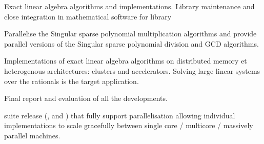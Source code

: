 \begin{workpackage}
\begin{wpdelivs}
  \begin{wpdeliv}[due=36,miles=hpc-prototype,id=LinBox-algo,dissem=PU,nature=DEM, lead=UJF,issue=110]
    {Exact linear algebra algorithms and implementations. Library maintenance and close integration
      in mathematical software for \Linbox library}
  \end{wpdeliv}
  \begin{wpdeliv}[due=48,miles=eval,id=singular-polyarith,dissem=PU,nature=DEM, lead=UK,issue=111]
      {Parallelise the Singular sparse polynomial multiplication algorithms and
        provide parallel versions of the Singular sparse polynomial division and GCD algorithms.}
\end{wpdeliv}
  \begin{wpdeliv}[due=48,miles=eval,id=LinBox-distributed,dissem=PU,nature=DEM, lead=UJF,issue=112]
    {Implementations of exact linear algebra algorithms on distributed memory et heterogenous
      architectures: clusters and accelerators. Solving large linear systems
      over the rationals is the target application.} 
  \end{wpdeliv}
  \begin{wpdeliv}[due=48,miles=eval,id=GAP-HPC-report,dissem=PU,nature=R,lead=SA,issue=113]
      {Final report and evaluation of all the \GAP developments.}
  \end{wpdeliv}
  \begin{wpdeliv}[due=48,id=pari-hpc2,dissem=PU,nature=DEM,lead=UB,issue=114]
  {\Pari suite release (\libpari, \GP and \GPtoC) that fully support parallelisation
   allowing individual implementations to scale gracefully between single
   core / multicore / massively parallel machines.}
  \end{wpdeliv}

\end{wpdelivs}
\end{workpackage}


